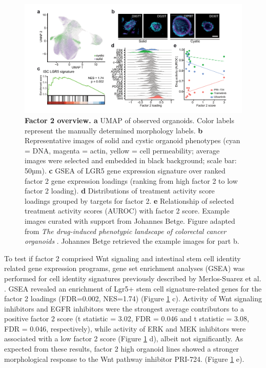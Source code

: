 \begin{flushleft}
\begin{figure}[h!]
\centering
\includegraphics[width=\textwidth,
                height=\textheight,
                keepaspectratio]{figures/promise/pdf/fig_5_1.pdf}
\caption[Factor 2 overview]{\textbf{Factor 2 overview. a} UMAP of observed organoids. Color labels represent the manually determined morphology labels. \textbf{b} Representative images of solid and cystic organoid phenotypes (cyan = DNA, magenta = actin, yellow = cell permeability; average images were selected and embedded in black background; scale bar: 50µm). \textbf{c} GSEA of LGR5 gene expression signature over ranked factor 2 gene expression loadings (ranking from high factor 2 to low factor 2 loading). \textbf{d} Distributions of treatment activity score loadings grouped by targets for factor 2. \textbf{e} Relationship of selected treatment activity scores (AUROC) with factor 2 score. Example images curated with support from Johannes Betge. Figure adapted from \textit{The drug-induced phenotypic landscape of colorectal cancer organoids} \parencite{betgeDruginducedPhenotypicLandscape2022}. Johannes Betge retrieved the example images for part b.}
\label{fig_251}
\end{figure}
\bigbreak

To test if factor 2 comprised Wnt signaling and intestinal stem cell identity related gene expression programs, gene set enrichment analyses (GSEA) was performed for cell identity signatures previously described by Merlos-Suarez et al. \parencite{merlos-suarezIntestinalStemCell2011}. GSEA revealed an enrichment of Lgr5+ stem cell signature-related genes for the factor 2 loadings (FDR=0.002, NES=1.74) (Figure \ref{fig_251} c). Activity of Wnt signaling inhibitors and EGFR inhibitors were the strongest average contributors to a positive factor 2 score (t statistic = 3.02, FDR = 0.046 and t statistic = 3.08, FDR = 0.046, respectively), while activity of ERK and MEK inhibitors were associated with a low factor 2 score (Figure \ref{fig_251} d), albeit not significantly. As expected from these results, factor 2 high organoid lines showed a stronger morphological response to the Wnt pathway inhibitor PRI-724. (Figure \ref{fig_251} e).


\end{flushleft}
